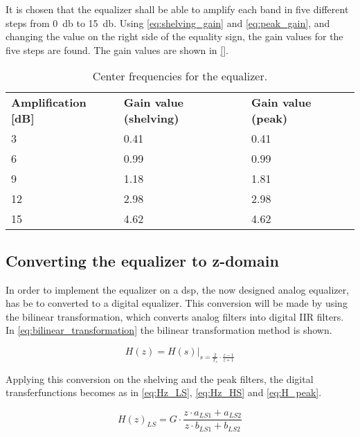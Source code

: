 It is chosen that the equalizer shall be able to amplify each band in five different steps from \SI{0}{\decibel} to \SI{15}{\decibel}. Using \autoref{eq:shelving_gain} and \autoref{eq:peak_gain}, and changing the value on the right side of the equality sign, the gain values for the five steps are found. The gain values are shown in \autoref{}. 

\begin{table}[htbp]
\centering
\caption{Center frequencies for the equalizer.}
\label{tab:center_frequencies}
\begin{tabular}{|l|l|l|}
\cline{1-3}
\textbf{Amplification [dB]} & \textbf{Gain value (shelving)} & \textbf{Gain value (peak)} \\ \cline{1-3} 
3 & 0.41 & 0.41 \\  \cline{1-3} 
6 & 0.99 & 0.99 \\ \cline{1-3} 
9 & 1.18 & 1.81 \\ \cline{1-3} 
12 & 2.98 & 2.98 \\ \cline{1-3} 
15 & 4.62 & 4.62 \\ \cline{1-3} 
\end{tabular}
\end{table}

\subsection{Converting the equalizer to z-domain}
In order to implement the equalizer on a \gls{dsp}, the now designed analog equalizer, has be to converted to a digital equalizer. This conversion will be made by using the bilinear transformation, which converts analog filters into digital IIR filters. In \autoref{eq:bilinear_transformation} the bilinear transformation method is shown.

\begin{equation}\label{eq:bilinear_transformation}
        H(z) = H(s) \Big|_{s = \frac{2}{T_s} \cdot \frac{z-1}{z+1}}
    \end{equation}
    
    \startexplain
    \stopexplain
    
Applying this conversion on the shelving and the peak filters, the digital transferfunctions becomes as in \autoref{eq:Hz_LS}, \autoref{eq:Hz_HS} and \autoref{eq:H_peak}.

\begin{equation}\label{eq:Hz_LS}
        H(z)_{LS} = G \cdot \frac{z \cdot a_{LS1} + a_{LS2}}{z \cdot b_{LS1} + b_{LS2}}
    \end{equation}
    
